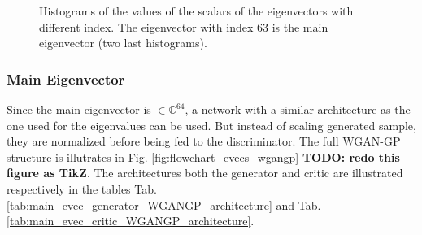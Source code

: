 \documentclass[11pt,a4paper,twoside]{report}
\begin{document}
\begin{figure}
    \centering
    \caption{Histograms of the values of the scalars of the eigenvectors with different index. The eigenvector with index $63$ is the main eigenvector (two last histograms).}
    \label{fig:histograms_eigenvectors}
\end{figure}

\subsubsection{Main Eigenvector}

Since the main eigenvector is $\in \mathbb{C}^{64}$, a network with a similar architecture as the one used for the eigenvalues can be used. But instead of scaling generated sample, they are normalized before being fed to the discriminator. The full WGAN-GP structure is illutrates in Fig. \ref{fig:flowchart_evecs_wgangp} \textbf{TODO: redo this figure as TikZ}. The architectures both the generator and critic are illustrated respectively in the tables Tab.\ref{tab:main_evec_generator_WGANGP_architecture} and Tab.\ref{tab:main_evec_critic_WGANGP_architecture}.
\end{document}
